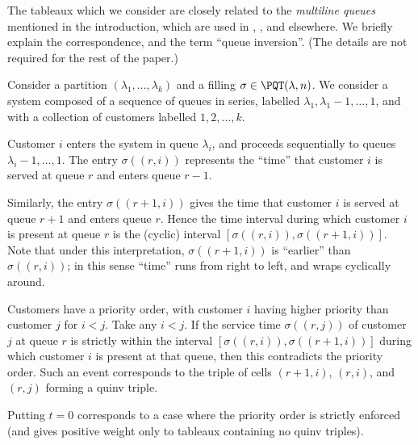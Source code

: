 \begin{remark}\label{rem:terminology}
The tableaux which we consider are closely related to the
\emph{multiline queues} mentioned in the introduction, which are used in 
\cite{FM07}, \cite{martin-2020}, \cite{CMW18} and elsewhere. 
We briefly explain the correspondence, and the term ``queue inversion''.
(The details are not required for the rest of the paper.)

Consider a partition $(\lambda_1, \dots, \lambda_k)$ and a filling $\sigma\in\PQT(\lambda,n)$. 
We consider a system composed of a sequence of queues in series,
labelled $\lambda_1, \lambda_1-1, \dots, 1$, 
and with a collection of customers labelled $1,2,\dots, k$. 

Customer $i$ enters the system in queue $\lambda_i$, and 
proceeds sequentially to queues $\lambda_i-1, \dots, 1$. 
The entry $\sigma((r,i))$ represents the ``time'' that customer
$i$ is served at queue $r$ and enters queue $r-1$. 

Similarly, the entry $\sigma((r+1,i))$ gives the time that customer $i$
is served at queue $r+1$ and enters queue $r$. Hence
the time interval during which customer $i$ is present at 
queue $r$ is the (cyclic) interval $[\sigma((r,i)), \sigma((r+1,i))]$. 
Note that under this interpretation, $\sigma((r+1,i))$ is ``earlier''
than $\sigma((r,i))$; in this sense
``time'' runs from right to left, and wraps 
cyclically around.

Customers have a priority order, with customer $i$ having
higher priority than customer $j$ for $i<j$. Take any $i<j$. If the service time
$\sigma((r,j))$ of customer $j$ at queue $r$ is strictly within the
interval $[\sigma((r,i)), \sigma((r+1,i))]$ during which customer $i$ is present
at that queue, then this contradicts the priority order. 
Such an event corresponds to 
the triple of cells $(r+1,i)$, $(r,i)$, and $(r,j)$ forming a quinv triple. 

Putting $t=0$ corresponds to a case where the priority order is strictly enforced
(and gives positive weight only to tableaux containing no quinv triples). 
\end{remark}

